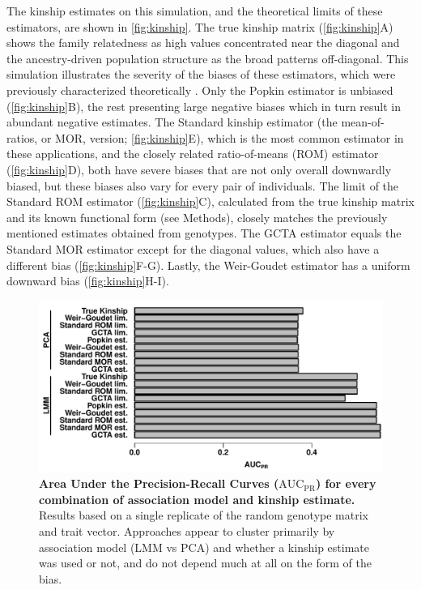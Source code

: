 \documentclass[11pt]{article}
\newcommand{\auc}{\text{AUC}_\text{PR}}
\begin{document}
The kinship estimates on this simulation, and the theoretical limits of these estimators, are shown in \cref{fig:kinship}.
The true kinship matrix (\cref{fig:kinship}A) shows the family relatedness as high values concentrated near the diagonal and the ancestry-driven population structure as the broad patterns off-diagonal.
This simulation illustrates the severity of the biases of these estimators, which were previously characterized theoretically \citep{ochoa_estimating_2021}.
Only the Popkin estimator is unbiased (\cref{fig:kinship}B), the rest presenting large negative biases which in turn result in abundant negative estimates.
The Standard kinship estimator (the mean-of-ratios, or MOR, version; \cref{fig:kinship}E), which is the most common estimator in these applications, and the closely related ratio-of-means (ROM) estimator (\cref{fig:kinship}D), both have severe biases that are not only overall downwardly biased, but these biases also vary for every pair of individuals.
The limit of the Standard ROM estimator (\cref{fig:kinship}C), calculated from the true kinship matrix and its known functional form (see Methods), closely matches the previously mentioned estimates obtained from genotypes.
The GCTA estimator equals the Standard MOR estimator except for the diagonal values, which also have a different bias (\cref{fig:kinship}F-G).
Lastly, the Weir-Goudet estimator has a uniform downward bias (\cref{fig:kinship}H-I).

\begin{figure}[bp!]
  \centering
  \includegraphics[width=\textwidth]{auc.pdf}
  \caption{
    {\bf Area Under the Precision-Recall Curves ($\auc$) for every combination of association model and kinship estimate.}
    Results based on a single replicate of the random genotype matrix and trait vector.
    Approaches appear to cluster primarily by association model (LMM vs PCA) and whether a kinship estimate was used or not, and do not depend much at all on the form of the bias.
  }
  \label{fig:auc}
\end{figure}
\end{document}
